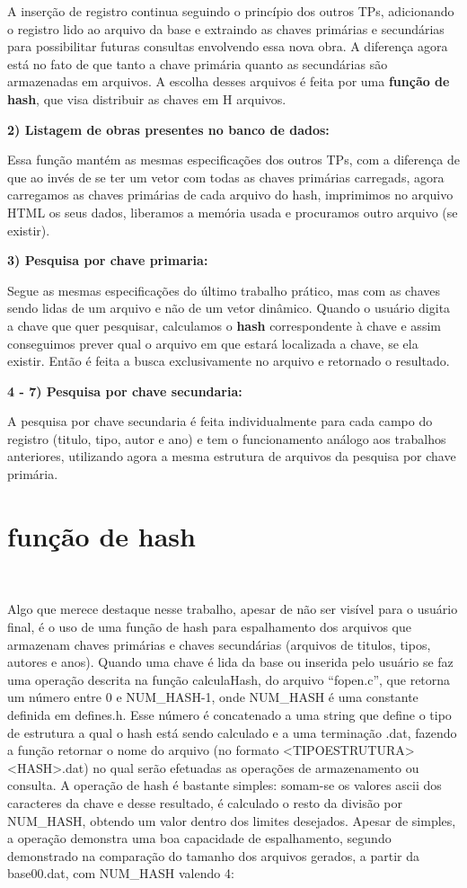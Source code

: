 \documentclass{article}
\begin{document}
A inserção de registro continua seguindo o princípio dos outros TPs, adicionando o registro lido ao arquivo da base e extraindo as chaves primárias e secundárias para possibilitar futuras consultas envolvendo essa nova obra. A diferença agora está no fato de que tanto a chave primária quanto as secundárias são armazenadas em arquivos. A escolha desses arquivos é feita por uma \textbf{função de hash}, que visa distribuir as chaves em H arquivos.



\textbf{2) Listagem de obras presentes no banco de dados:}

Essa função mantém as mesmas especificações dos outros TPs, com a diferença de que ao invés de se ter um vetor com todas as chaves primárias carregads, agora carregamos as chaves primárias de cada arquivo do hash, imprimimos no arquivo HTML os seus dados, liberamos a memória usada e procuramos outro arquivo (se existir).



\textbf{3) Pesquisa por chave primaria:}

Segue as mesmas especificações do último trabalho prático, mas com as chaves sendo lidas de um arquivo e não de um vetor dinâmico. Quando o usuário digita a chave que quer pesquisar, calculamos o \textbf{hash} correspondente à chave e assim conseguimos prever qual o arquivo em que estará localizada a chave, se ela existir. Então é feita a busca exclusivamente no arquivo e retornado o resultado. 



\textbf{4 - 7) Pesquisa por chave secundaria:}

A pesquisa por chave secundaria é feita individualmente para cada campo do registro (titulo, tipo, autor e ano) e tem o funcionamento análogo aos trabalhos anteriores, utilizando agora a mesma estrutura de arquivos da pesquisa por chave primária.


\section{função de hash}\

Algo que merece destaque nesse trabalho, apesar de não ser visível para o usuário final, é o uso de uma função de hash para espalhamento dos arquivos que armazenam chaves primárias e chaves secundárias (arquivos de titulos, tipos, autores e anos).
Quando uma chave é lida da base ou inserida pelo usuário se faz uma operação descrita na função calculaHash, do arquivo ``fopen.c'', que retorna um número entre 0 e NUM_HASH-1, onde NUM_HASH é uma constante definida em defines.h. Esse número é concatenado a uma string que define o tipo de estrutura a qual o hash está sendo calculado e a uma terminação .dat, fazendo a função retornar o nome do arquivo (no formato <TIPOESTRUTURA><HASH>.dat) no qual serão efetuadas as operações de armazenamento ou consulta.
A operação de hash é bastante simples: somam-se os valores ascii dos caracteres da chave e desse resultado, é calculado o resto da divisão por NUM_HASH, obtendo um valor dentro dos limites desejados.
Apesar de simples, a operação demonstra uma boa capacidade de espalhamento, segundo demonstrado na comparação do tamanho dos arquivos gerados, a partir da base00.dat, com NUM_HASH valendo 4:
\end{document}
